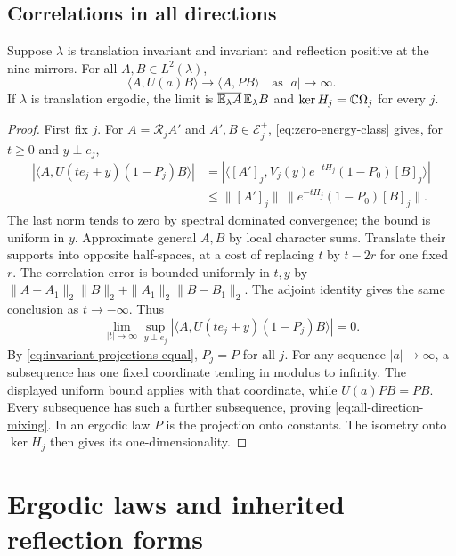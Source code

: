 \subsection{Correlations in all directions}

\begin{proposition}\label{prop:all-direction-mixing}
Suppose $\lambda$ is translation invariant and invariant and
reflection positive at the nine mirrors. For all $A,B\in L^2(\lambda)$,
\begin{equation}\label{eq:all-direction-mixing}
 \langle A,U(a)B\rangle\longrightarrow\langle A,PB\rangle
                      \quad\text{as }|a|\longrightarrow\infty.
\end{equation}
If $\lambda$ is translation ergodic, the limit is
$\overline{\mathbb E_\lambda A}\,\mathbb E_\lambda B$ and
$\ker H_j=\mathbb C\Omega_j$ for every $j$.
\end{proposition}

\begin{proof}
First fix $j$. For $A=\mathcal R_jA'$ and $A',B\in\mathcal E_j^+$,
\eqref{eq:zero-energy-class} gives, for $t\ge0$ and $y\perp e_j$,
\begin{align*}
 |\langle A,U(te_j+y)(1-P_j)B\rangle|
 &=|\langle[A']_j,V_j(y)e^{-tH_j}(1-P_0)[B]_j\rangle|\\
 &\le\|[A']_j\|\,\|e^{-tH_j}(1-P_0)[B]_j\|.
\end{align*}
The last norm tends to zero by spectral dominated convergence;
the bound is uniform in $y$. Approximate general $A,B$ by local
character sums. Translate their supports into opposite half-spaces,
at a cost of replacing $t$ by $t-2r$ for one fixed $r$.
The correlation error is bounded uniformly in $t,y$ by
$\|A-A_1\|_2\|B\|_2+\|A_1\|_2\|B-B_1\|_2$.
The adjoint identity gives the same conclusion as $t\to-\infty$.
Thus
\[
 \lim_{|t|\to\infty}\sup_{y\perp e_j}
 |\langle A,U(te_j+y)(1-P_j)B\rangle|=0.
\]
By \eqref{eq:invariant-projections-equal}, $P_j=P$ for all $j$.
For any sequence $|a|\to\infty$, a subsequence has one fixed
coordinate tending in modulus to infinity. The displayed uniform
bound applies with that coordinate, while $U(a)PB=PB$.
Every subsequence has such a further subsequence, proving
\eqref{eq:all-direction-mixing}. In an ergodic law $P$ is the
projection onto constants. The isometry onto $\ker H_j$ then gives
its one-dimensionality.
\end{proof}

\section{Ergodic laws and inherited reflection forms}
\label{subsec:component-hypotheses}

